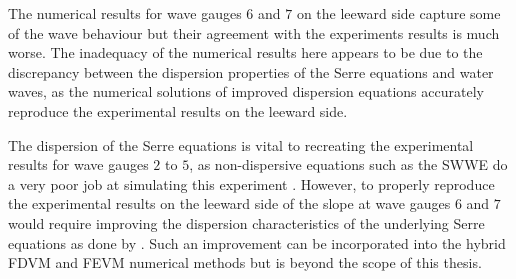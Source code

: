 The numerical results for wave gauges $6$ and $7$ on the leeward side capture some of the wave behaviour but their agreement with the experiments results is much worse. The inadequacy of the numerical results here appears to be due to the discrepancy between the dispersion properties of the Serre equations and water waves, as the numerical solutions of improved dispersion equations \cite{Beji-Battjes-1994-1,Lannes-2013} accurately reproduce the experimental results on the leeward side.

The dispersion of the Serre equations is vital to recreating the experimental results for wave gauges $2$ to $5$, as non-dispersive equations such as the SWWE do a very poor job at simulating this experiment \cite{Pitt-2017-1725}. However, to properly reproduce the experimental results on the leeward side of the slope at wave gauges $6$ and $7$  would require improving the dispersion characteristics of the underlying Serre equations as done by \citet{Barthelemy-2004-315}. Such an improvement can be incorporated into the hybrid FDVM and FEVM numerical methods \cite{Zoppou-2014} but is beyond the scope of this thesis. 

